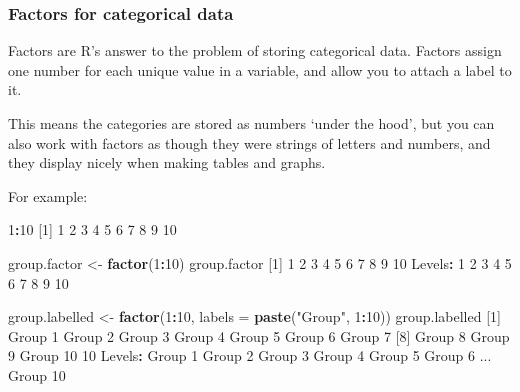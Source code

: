 \documentclass[]{article}
\newenvironment{Shaded}{\begin{snugshade}}{\end{snugshade}}
\newcommand{\DataTypeTok}[1]{\textcolor[rgb]{0.13,0.29,0.53}{#1}}
\newcommand{\DecValTok}[1]{\textcolor[rgb]{0.00,0.00,0.81}{#1}}
\newcommand{\KeywordTok}[1]{\textcolor[rgb]{0.13,0.29,0.53}{\textbf{#1}}}
\newcommand{\NormalTok}[1]{#1}
\newcommand{\OperatorTok}[1]{\textcolor[rgb]{0.81,0.36,0.00}{\textbf{#1}}}
\newcommand{\StringTok}[1]{\textcolor[rgb]{0.31,0.60,0.02}{#1}}
\begin{document}
\hypertarget{facsforcategs}{%
\subsubsection*{Factors for categorical data}\label{facsforcategs}}

Factors are R's answer to the problem of storing categorical data.
Factors assign one number for each unique value in a variable, and allow you to attach a label to it.

This means the categories are stored as numbers `under the hood', but you can also work with factors as though they were strings of letters and numbers, and they display nicely when making tables and graphs.

For example:

\begin{Shaded}
\begin{Highlighting}[]
\DecValTok{1}\OperatorTok{:}\DecValTok{10}
\NormalTok{ [}\DecValTok{1}\NormalTok{]  }\DecValTok{1}  \DecValTok{2}  \DecValTok{3}  \DecValTok{4}  \DecValTok{5}  \DecValTok{6}  \DecValTok{7}  \DecValTok{8}  \DecValTok{9} \DecValTok{10}

\NormalTok{group.factor <-}\StringTok{ }\KeywordTok{factor}\NormalTok{(}\DecValTok{1}\OperatorTok{:}\DecValTok{10}\NormalTok{)}
\NormalTok{group.factor}
\NormalTok{ [}\DecValTok{1}\NormalTok{] }\DecValTok{1}  \DecValTok{2}  \DecValTok{3}  \DecValTok{4}  \DecValTok{5}  \DecValTok{6}  \DecValTok{7}  \DecValTok{8}  \DecValTok{9}  \DecValTok{10}
\NormalTok{Levels}\OperatorTok{:}\StringTok{ }\DecValTok{1} \DecValTok{2} \DecValTok{3} \DecValTok{4} \DecValTok{5} \DecValTok{6} \DecValTok{7} \DecValTok{8} \DecValTok{9} \DecValTok{10}

\NormalTok{group.labelled <-}\StringTok{ }\KeywordTok{factor}\NormalTok{(}\DecValTok{1}\OperatorTok{:}\DecValTok{10}\NormalTok{, }\DataTypeTok{labels =} \KeywordTok{paste}\NormalTok{(}\StringTok{"Group"}\NormalTok{, }\DecValTok{1}\OperatorTok{:}\DecValTok{10}\NormalTok{))}
\NormalTok{group.labelled}
\NormalTok{ [}\DecValTok{1}\NormalTok{] Group }\DecValTok{1}\NormalTok{  Group }\DecValTok{2}\NormalTok{  Group }\DecValTok{3}\NormalTok{  Group }\DecValTok{4}\NormalTok{  Group }\DecValTok{5}\NormalTok{  Group }\DecValTok{6}\NormalTok{  Group }\DecValTok{7} 
\NormalTok{ [}\DecValTok{8}\NormalTok{] Group }\DecValTok{8}\NormalTok{  Group }\DecValTok{9}\NormalTok{  Group }\DecValTok{10}
\DecValTok{10}\NormalTok{ Levels}\OperatorTok{:}\StringTok{ }\NormalTok{Group }\DecValTok{1}\NormalTok{ Group }\DecValTok{2}\NormalTok{ Group }\DecValTok{3}\NormalTok{ Group }\DecValTok{4}\NormalTok{ Group }\DecValTok{5}\NormalTok{ Group }\DecValTok{6}\NormalTok{ ... Group }\DecValTok{10}
\end{Highlighting}
\end{Shaded}
\end{document}
